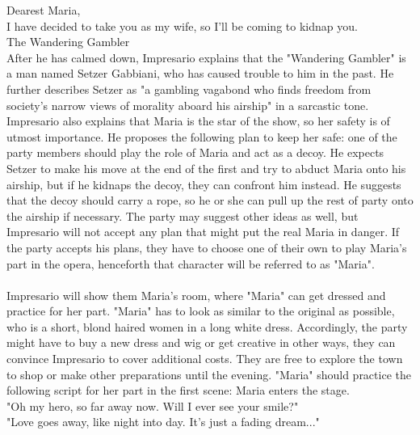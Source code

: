 %
\vfill
%
Dearest Maria,\vspace{0.4cm}\\
I have decided to take you as my wife, so I'll be coming to kidnap you.\vspace{0.4cm}\\
\hspace*{0.5cm}The Wandering Gambler\\
%
\newpage
%
After he has calmed down, Impresario explains that the "Wandering Gambler" is a man named Setzer Gabbiani, who has caused trouble to him in the past.
He further describes Setzer as "a gambling vagabond who finds freedom from society's narrow views of morality aboard his airship" in a sarcastic tone.
Impresario also explains that Maria is the star of the show, so her safety is of utmost importance.
He proposes the following plan to keep her safe: one of the party members should play the role of Maria and act as a decoy.
He expects Setzer to make his move at the end of the first and try to abduct Maria onto his airship, but if he kidnaps the decoy, they can confront him instead.
He suggests that the decoy should carry a rope, so he or she can pull up the rest of party onto the airship if necessary.
The party may suggest other ideas as well, but Impresario will not accept any plan that might put the real Maria in danger.
If the party accepts his plans, they have to choose one of their own to play Maria's part in the opera, henceforth that character will be referred to as "Maria".
%
\vfill
%
\\\\
%
Impresario will show them Maria's room, where "Maria" can get dressed and practice for her part.
"Maria" has to look as similar to the original as possible, who is a short, blond haired women in a long white dress.
Accordingly, the party might have to buy a new dress and wig or get creative in other ways, they can convince Impresario to cover additional costs. 
They are free to explore the town to shop or make other preparations until the evening. 
"Maria" should practice the following script for her part in the first scene:
%
\vfill
%
Maria enters the stage.\vspace{0.2cm}\\
"Oh my hero, so far away now. Will I ever see your smile?"\vspace{0.2cm}\\ 
"Love goes away, like night into day. It's just a fading dream..."\vspace{0.2cm}\\ 
